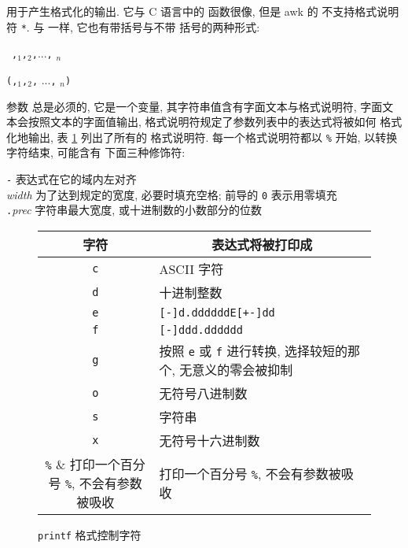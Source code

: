 \printf 用于产生格式化的输出. 它与 C 语言中的 \printf 函数很像, 但是 awk 
的 \printf 不支持格式说明符 \verb'*'. 与 \print 一样, 它也有带括号与不带
括号的两种形式:
\begin{pattern}
    \printf\ \fmt\verb','\expr$_1$\verb','\expr$_2$\verb','...\verb','
    \expr$_n$ \par 
    \printf\verb'('\fmt\verb','\expr$_1$\verb','\expr$_2$\verb','
    ...\verb',' \expr$_n$\verb')'
\end{pattern}
参数 \fmt 总是必须的, 它是一个变量, 其字符串值含有字面文本与格式说明符,
字面文本会按照文本的字面值输出, 格式说明符规定了参数列表中的表达式将被如何
格式化地输出, 表 \ref{tbl:printf_format_control_characters} 列出了所有的
格式说明符. 每一个格式说明符都以 \verb'%' 开始, 以转换字符结束, 可能含有
下面三种修饰符:
\begin{tabbing}
    \indent\verb'-' \hspace{4em} \= 表达式在它的域内左对齐 \\
    \indent\textit{width}  \> 为了达到规定的宽度, 必要时填充空格; 前导的 \verb'0'
    表示用零填充 \\
    \indent\verb'.'\textit{prec}   \> 字符串最大宽度, 或十进制数的小数部分的位数
\end{tabbing}
\begin{figure}
        \captionsetup{type=table}
        \caption{\texttt{printf} 格式控制字符}
        \label{tbl:printf_format_control_characters}
\begin{center}
        \begin{tabular}{c|l}
            \hline
            \hline
            字符    & \multicolumn{1}{c}{表达式将被打印成} \\
            \hline
            \verb'c' & ASCII 字符 \\
            \verb'd' & 十进制整数 \\
            \verb'e' & \verb'[-]d.ddddddE[+-]dd' \\
            \verb'f' & \verb'[-]ddd.dddddd' \\
            \verb'g' & 按照 \verb'e' 或 \verb'f' 进行转换, 选择较短的那个,
                无意义的零会被抑制 \\
            \verb'o' & 无符号八进制数 \\
            \verb's' & 字符串 \\
            \verb'x' & 无符号十六进制数 \\
            \verb'%' & 打印一个百分号 \verb'%', 不会有参数被吸收 \\
            \hline
        \end{tabular}
\end{center}
    \end{figure}

